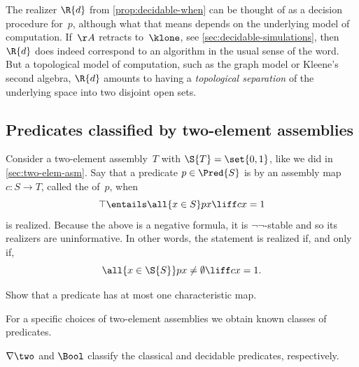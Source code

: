 The realizer $\R{d}$ from \cref{prop:decidable-when} can be thought of as a decision procedure for~$p$, although what that means depends on the underlying model of computation. If~$\AA$ retracts to~$\klone$, see \cref{sec:decidable-simulations}, then~$\R{d}$ does indeed correspond to an algorithm in the usual sense of the word. But a topological model of computation, such as the graph model or Kleene's second algebra, $\R{d}$ amounts to having a \emph{topological separation} of the underlying space into two disjoint open sets.


\subsection{Predicates classified by two-element assemblies}
\label{sec:predicates-classified}

Consider a two-element assembly~$T$ with $\S{T} = \set{0,1}$, like we did in \cref{sec:two-elem-asm}. Say that a predicate $p \in \Pred{S}$ is  by an assembly map $c : S \to T$, called the  of~$p$, when
%
\begin{equation*}
  \top \entails \all{x \in S} p x \liff c x = 1
\end{equation*}
%
is realized. Because the above is a negative formula, it is $\neg\neg$-stable and so its realizers are uninformative. In other words, the statement is realized if, and only if,
%
\begin{equation*}
  \all{x \in \S{S}} p x \neq \emptyset \liff c x = 1.
\end{equation*}

\begin{exercise}
  Show that a predicate has at most one characteristic map.
\end{exercise}

For a specific choices of two-element assemblies we obtain known classes of predicates.

\begin{proposition}
  $\nabla \two$ and $\Bool$ classify the classical and decidable predicates, respectively.
\end{proposition}

